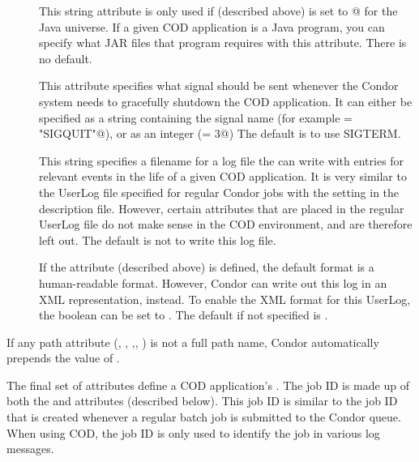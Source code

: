 \begin{description}
 \item[] This string attribute is only used if
    (described above) is set to @ for the
   Java universe.
   If a given COD application is a Java program, you can specify what
   JAR files that program requires with this attribute.
   There is no default.

 \item[] This attribute specifies what signal should be
   sent whenever the Condor system needs to gracefully shutdown the
   COD application.
   It can either be specified as a string containing the signal name
   (for example \verb@KillSig = "SIGQUIT"@), or as an integer
   (\verb@KillSig = 3@)
   The default is to use SIGTERM.

 \item[] This string specifies a filename for a
   log file the  can write with entries for relevant 
   events in the life of a given COD application.
   It is very similar to the UserLog file specified for regular Condor
   jobs with the  setting in the  description
   file.
   However, certain attributes that are placed in the regular UserLog
   file do not make sense in the COD environment, and are therefore
   left out.
   The default is not to write this log file.

 \item[] If the 
   attribute (described above) is defined, the default format is a
   human-readable format.
   However, Condor can write out this log in an XML representation,
   instead.
   To enable the XML format for this UserLog, the
    boolean can be set to \verb@TRUE@.
   The default if not specified is \verb@FALSE@.

\end{description}

\Note If any path attribute (, ,
,, ) is not a full path name,
Condor automatically prepends the value of .

The final set of attributes define a COD application's .
The job ID is made up of both the  and 
attributes (described below).
This job ID is similar to the job ID that is created whenever a
regular batch job is submitted to the Condor queue.
When using COD, the job ID is only used to identify the job in various
log messages.

